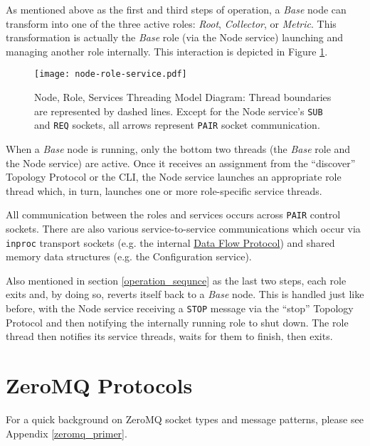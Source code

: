 As mentioned above as the first and third steps of \dcamp operation, a \textit{Base} node can transform into one of the
three active \dcamp roles: \textit{Root}, \textit{Collector}, or \textit{Metric}. This transformation is actually the
\textit{Base} role (via the Node service) launching and managing another role internally. This interaction is depicted
in Figure \ref{fig:node_role_service_image}.

\begin{figure}[H]
    \centering
    \texttt{[image: node-role-service.pdf]}
    \caption[Node, Role, Services Threading Model Diagram]
            {Node, Role, Services Threading Model Diagram: Thread boundaries are represented by dashed lines. Except for
	     the Node service's \texttt{SUB} and \texttt{REQ} sockets, all arrows represent \texttt{PAIR} socket
	     communication.}
    \label{fig:node_role_service_image}
\end{figure}

When a \textit{Base} node is running, only the bottom two threads (the \textit{Base} role and the Node service) are
active. Once it receives an assignment from the ``discover'' Topology Protocol or the \dcamp CLI, the Node service
launches an appropriate role thread which, in turn, launches one or more role-specific service threads.

All communication between the roles and services occurs across \texttt{PAIR} control sockets. There are also various
service-to-service communications which occur via \texttt{inproc} transport sockets (e.g. the internal
\hyperref[proto_data]{Data Flow Protocol}) and shared memory data structures (e.g. the Configuration service).

Also mentioned in section \ref{operation_sequnce} as the last two steps, each role exits and, by doing so, reverts
itself back to a \textit{Base} node. This is handled just like before, with the Node service receiving a \texttt{STOP}
message via the ``stop'' Topology Protocol and then notifying the internally running role to shut down. The role thread
then notifies its service threads, waits for them to finish, then exits.

\section{ZeroMQ Protocols}

For a quick background on ZeroMQ socket types and message patterns, please see Appendix \ref{zeromq_primer}.






